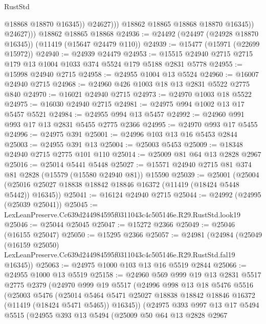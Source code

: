 \begin{lexlean}{RustStd}
\begin{coremodule}
                        @18868
                        @18870
                        @16345))
                    @24627)))
              @18862
              @18865
              @18868
              @18870
              @16345))
          @24627)))
    @18862
    @18865
    @18868
@24936 := @24492 (@24497 (@24928 @18870 @16345)) (@11419 (@15647 @24479 @110))
@24939 := @15477 (@15971 (@22699 @15972))
@24940 := @24939 @24479
@24953 := @15515 @24940 @2715 @2715 @179 @13 @1004 @1033 @374 @5524 @179 @5188 @2831 @5778
@24955 := @15998 @24940 @2715
@24958 := @24955 @1004 @13 @5524
@24960 := @16007 @24940 @2715
@24968 := @24960 @426 @1003 @18 @13 @2831 @5522 @2775 @840
@24970 := @16021 @24940 @2715
@24973 := @24970 @1003 @18 @5522
@24975 := @16030 @24940 @2715
@24981 := @24975 @994 @1002 @13 @17 @5457 @5521
@24984 := @24955 @994 @13 @5457
@24992 := @24960 @991 @993 @17 @13 @2831 @5455 @2775 @2366
@24995 := @24970 @993 @17 @5455
@24996 := @24975 @391
@25001 := @24996 @103 @13 @16 @5453 @2844
@25003 := @24955 @391 @13
@25004 := @25003 @5453
@25009 := @18348 @24940 @2715 @2775 @101 @110
@25014 := @25009 @81 @64 @13 @2828 @2967
@25016 := @25014 @5441 @5448
@25027 := @15571 @24940 @2715 @81 @374 @81 @2828 (@15579 (@15580 @24940 @81)) @15590
@25039 := @25001
    (@25004 (@25016 @25027 @18838 @18842 @18846 @16372 (@11419 (@18424 @5448 @5442)) @16345))
@25041 := @16124 @24940 @2715
@25044 := @24992 (@24995 (@25039 @25041))
@25045 := LexLeanPreserve.Cc639d244984595f0311043c4c505146e.R29.RustStd.look19
@25046 := @25044 @25045
@25047 := @15272 @2366
@25049 := @25046 (@16155 @25047)
@25050 := @15295 @2366
@25057 := @24981
    (@24984
      (@25049
        (@16159 @25050)
        LexLeanPreserve.Cc639d244984595f0311043c4c505146e.R29.RustStd.fal19
        @16345))
@25063 := @24975 @1000 @103 @13 @16 @5519 @2844
@25066 := @24955 @1000 @13 @5519
@25158 := @24960
    @569
    @999
    @19
    @13
    @2831
    @5517
    @2775
    @2379
    (@24970
      @999
      @19
      @5517
      (@24996
        @998
        @13
        @18
        @5476
        @5516
        (@25003
          @5476
          (@25014
            @5464
            @5471
            @25027
            @18838
            @18842
            @18846
            @16372
            (@11419 (@18424 @5471 @5465))
            @16345))
        (@24975
          @393
          @997
          @13
          @17
          @5494
          @5515
          (@24955
            @393
            @13
            @5494
            (@25009
              @50
              @64
              @13
              @2828
              @2967

\end{coremodule}
\end{lexlean}
